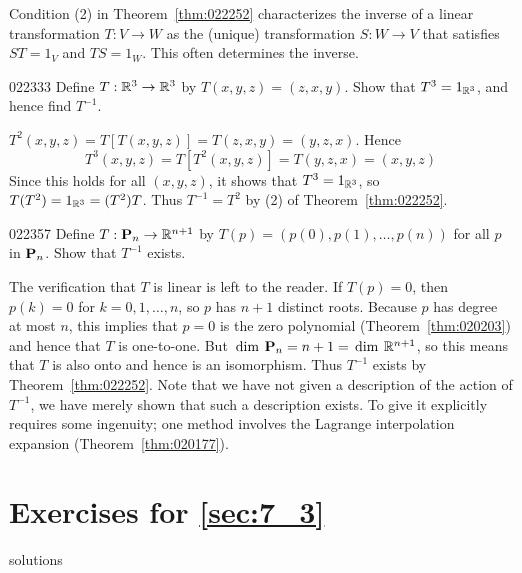 Condition (2) in Theorem~\ref{thm:022252} characterizes the inverse of a linear transformation $T : V \to W$ as the (unique) transformation $S : W \to V$ that satisfies $ST = 1_{V}$ and $TS = 1_{W}$. This often determines the inverse.


\begin{example}{}{022333}
Define $T : \mathbb{R}^3 \to \mathbb{R}^3$ by $T(x, y, z) = (z, x, y)$. Show that $T^{3} = 1_{\mathbb{R}^3}$, and hence find $T^{-1}$.


\begin{solution}
  $T^{2}(x, y, z) = T\left[T(x, y, z)\right] = T(z, x, y) = (y, z, x)$. Hence
\begin{equation*}
T^3(x, y, z) = T\left[T^2(x, y, z)\right] = T(y, z, x) = (x, y, z)
\end{equation*}
Since this holds for all $(x, y, z)$, it shows that $T^3 = 1_{\mathbb{R}^3}$, so $T(T^{2}) = 1_{\mathbb{R}^3} = (T^{2})T$. Thus $T^{-1} = T^{2}$ by (2) of Theorem~\ref{thm:022252}.
\end{solution}
\end{example}

\begin{example}{}{022357}
Define $T : \textbf{P}_{n} \to \mathbb{R}^{n+1}$ by $T(p) = (p(0), p(1), \dots, p(n))$ for all $p$ in $\textbf{P}_{n}$. Show that $T^{-1}$ exists.


\begin{solution}
  The verification that $T$ is linear is left to the reader. If $T(p) = 0$, then $p(k) = 0$ for $k = 0, 1, \dots, n$, so $p$ has $n + 1$ distinct roots. Because $p$ has degree at most $n$, this implies that $p = 0$ is the zero polynomial (Theorem~\ref{thm:020203}) and hence that $T$ is one-to-one. But $\thinspace\operatorname{dim \medspace}\textbf{P}_{n} = n + 1 = \thinspace\operatorname{dim \medspace}\mathbb{R}^{n+1}$, so this means that $T$ is also onto and hence is an isomorphism. Thus $T^{-1}$ exists by Theorem~\ref{thm:022252}. Note that we have not given a description of the action of $T^{-1}$, we have merely shown that such a description exists. To give it explicitly requires some ingenuity; one method involves the Lagrange interpolation expansion (Theorem~\ref{thm:020177}).
\end{solution}
\end{example}

\section*{Exercises for \ref{sec:7_3}}

\begin{Filesave}{solutions}
\end{Filesave}

